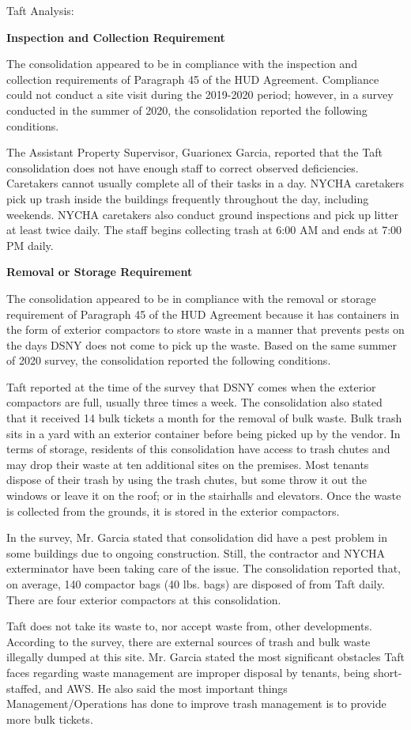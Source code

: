 Taft Analysis: 

\textbf{Inspection and Collection Requirement} 

 

The consolidation appeared to be in compliance with the inspection and collection requirements of Paragraph 45 of the HUD Agreement. Compliance could not conduct a site visit during the 2019-2020 period; however, in a survey conducted in the summer of 2020, the consolidation reported the following conditions.

The Assistant Property Supervisor, Guarionex Garcia, reported that the Taft consolidation does not have enough staff to correct observed deficiencies. Caretakers cannot usually complete all of their tasks in a day. NYCHA caretakers pick up trash inside the buildings frequently throughout the day, including weekends. NYCHA caretakers also conduct ground inspections and pick up litter at least twice daily. The staff begins collecting trash at 6:00 AM and ends at 7:00 PM daily.

\textbf{Removal or Storage Requirement} 

The consolidation appeared to be in compliance with the removal or storage requirement of Paragraph  45 of the HUD Agreement because it has containers in the form of exterior compactors to store waste in a manner that prevents pests on the days DSNY does not come to pick up the waste. Based on the same summer of  2020  survey, the consolidation reported the following conditions.

 

Taft reported at the time of the survey that DSNY comes when the exterior compactors are full, usually three times a week. The consolidation also stated that it received 14 bulk tickets a month for the removal of bulk waste. Bulk trash sits in a yard with an exterior container before being picked up by the vendor. In terms of storage, residents of this consolidation have access to trash chutes and may drop their waste at ten additional sites on the premises.  Most tenants dispose of their trash by using the trash chutes, but some throw it out the windows or leave it on the roof; or in the stairhalls and elevators. Once the waste is collected from the grounds, it is stored in the exterior compactors.

 

In the survey, Mr. Garcia stated that consolidation did have a pest problem in some buildings due to ongoing construction. Still, the contractor and NYCHA exterminator have been taking care of the issue. The consolidation reported that, on average, 140 compactor bags (40 lbs. bags)  are disposed of from Taft daily. There are four exterior compactors at this consolidation.

Taft does not take its waste to, nor accept waste from, other developments. According to the survey, there are external sources of trash and bulk waste illegally dumped at this site. Mr. Garcia stated the most significant obstacles Taft faces regarding waste management are improper disposal by tenants, being short-staffed, and AWS.  He also said the most important things Management/Operations has done to improve trash management is to provide more bulk tickets.

 